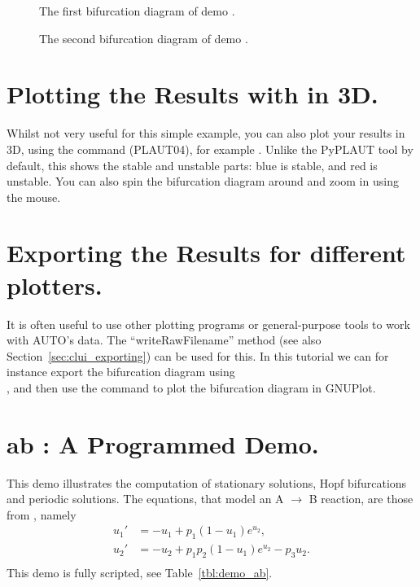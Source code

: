 \documentclass[12pt]{report}
\begin{document}
\begin{figure}[p]
\epsfysize 9.0cm
\centerline{}
\caption{The first bifurcation diagram of demo .}
\label{fig:cusp_1}
\end{figure}
\begin{figure}[p]
\epsfysize 9.0cm
\centerline{}
\caption{The second bifurcation diagram of demo .}
\label{fig:cusp_2}
\end{figure}

\section{ Plotting the Results with \AUTO in 3D.}
Whilst not very useful for this simple example, you can also plot
your results in 3D, using the  command ({\cal PLAUT04}), for example
. Unlike the PyPLAUT tool by default, this shows
the stable and unstable parts: blue is stable, and red is unstable. You can also
spin the bifurcation diagram around and zoom in using the mouse.

\section{ Exporting the Results for different plotters.}
It is often useful to use other plotting programs or general-purpose
tools to work with AUTO's data. The ``writeRawFilename'' method (see
also Section~\ref{sec:clui_exporting}) can be used for this.
In this tutorial we can for
instance export the bifurcation diagram using\\
, and then use
the command  to plot
the bifurcation diagram in GNUPlot.

\newpage
\section{ ab : A Programmed Demo.} \label{sec:Demos_ab}
This demo illustrates the computation of 
stationary solutions,
Hopf bifurcations and 
periodic solutions.
The equations, that model an A $\to$ B  reaction, are those from
 \citeyear{URP:74}, namely
\begin{equation} \begin{array}{cl}
  u_1 ' &=  -u_1 + p_1 (1-u_1) e^{u_2}, \\
  u_2 ' &=  -u_2 +  p_1 p_2 ( 1-u_1) e^{u_2} - p_3 u_2.\\
\end{array} \end{equation}
This demo is fully scripted, see Table~\ref{tbl:demo_ab}.
\end{document}
